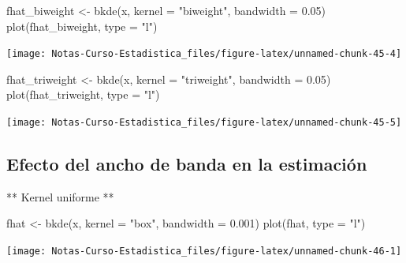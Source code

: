 \documentclass[
  12pt,
]{book}
\newenvironment{Shaded}{\begin{snugshade}}{\end{snugshade}}
\newcommand{\AttributeTok}[1]{\textcolor[rgb]{0.77,0.63,0.00}{#1}}
\newcommand{\FloatTok}[1]{\textcolor[rgb]{0.00,0.00,0.81}{#1}}
\newcommand{\FunctionTok}[1]{\textcolor[rgb]{0.00,0.00,0.00}{#1}}
\newcommand{\NormalTok}[1]{#1}
\newcommand{\OtherTok}[1]{\textcolor[rgb]{0.56,0.35,0.01}{#1}}
\newcommand{\StringTok}[1]{\textcolor[rgb]{0.31,0.60,0.02}{#1}}
\begin{document}
\begin{Shaded}
\begin{Highlighting}[]
\NormalTok{fhat\_biweight }\OtherTok{\textless{}{-}} \FunctionTok{bkde}\NormalTok{(x, }\AttributeTok{kernel =} \StringTok{"biweight"}\NormalTok{, }\AttributeTok{bandwidth =} \FloatTok{0.05}\NormalTok{)}
\FunctionTok{plot}\NormalTok{(fhat\_biweight, }\AttributeTok{type =} \StringTok{"l"}\NormalTok{)}
\end{Highlighting}
\end{Shaded}

\begin{center}\texttt{[image: Notas-Curso-Estadistica\_files/figure-latex/unnamed-chunk-45-4]} \end{center}

\begin{Shaded}
\begin{Highlighting}[]
\NormalTok{fhat\_triweight }\OtherTok{\textless{}{-}} \FunctionTok{bkde}\NormalTok{(x, }\AttributeTok{kernel =} \StringTok{"triweight"}\NormalTok{, }\AttributeTok{bandwidth =} \FloatTok{0.05}\NormalTok{)}
\FunctionTok{plot}\NormalTok{(fhat\_triweight, }\AttributeTok{type =} \StringTok{"l"}\NormalTok{)}
\end{Highlighting}
\end{Shaded}

\begin{center}\texttt{[image: Notas-Curso-Estadistica\_files/figure-latex/unnamed-chunk-45-5]} \end{center}

\hypertarget{efecto-del-ancho-de-banda-en-la-estimaciuxf3n}{%
\subsection{Efecto del ancho de banda en la
estimación}\label{efecto-del-ancho-de-banda-en-la-estimaciuxf3n}}

** Kernel uniforme **

\begin{Shaded}
\begin{Highlighting}[]
\NormalTok{fhat }\OtherTok{\textless{}{-}} \FunctionTok{bkde}\NormalTok{(x, }\AttributeTok{kernel =} \StringTok{"box"}\NormalTok{, }\AttributeTok{bandwidth =} \FloatTok{0.001}\NormalTok{)}
\FunctionTok{plot}\NormalTok{(fhat, }\AttributeTok{type =} \StringTok{"l"}\NormalTok{)}
\end{Highlighting}
\end{Shaded}

\begin{center}\texttt{[image: Notas-Curso-Estadistica\_files/figure-latex/unnamed-chunk-46-1]} \end{center}
\end{document}

